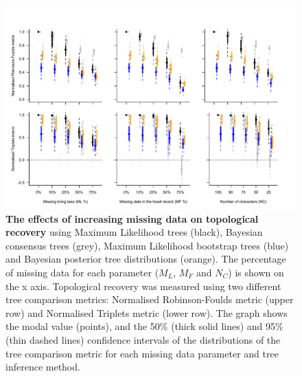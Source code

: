 \begin{figure}[!ht]
\centering
    \includegraphics[width=1\textwidth]{TEM/Figures/Fig4_revised.pdf}
\caption[Effects of increasing missing data on topological recovery]{\textbf{The effects of increasing missing data on topological recovery} using Maximum Likelihood trees (black), Bayesian consensus trees (grey), Maximum Likelihood bootstrap trees (blue) and Bayesian posterior tree distributions (orange). The percentage of missing data for each parameter ($M_{L}$, $M_{F}$ and $N_{C}$) is shown on the x axis. Topological recovery was measured using two different tree comparison metrics: Normalised Robinson-Foulds metric (upper row) and Normalised Triplets metric (lower row). The graph shows the modal value (points), and the 50\% (thick solid lines) and 95\% (thin dashed lines) confidence intervals of the distributions of the tree comparison metric for each missing data parameter and tree inference method.}
\label{Fig_Results-permeth_perparam} 
\end{figure}

